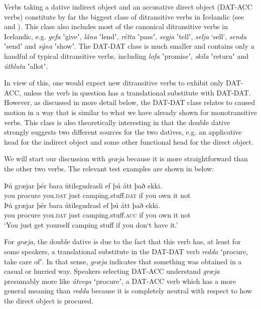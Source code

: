 \documentclass[output=paper,modfonts,nonflat,colorlinks,citecolor=brown]{langsci/langscibook}
\begin{document}
Verbs taking a dative indirect object and an accusative direct object (DAT-ACC verbs) constitute by far the biggest class of ditransitive verbs in Icelandic (see \citealt{ZaenenMalingThráinsson1985} and \citealt{Jónsson2000}). This class also includes most of the canonical ditransitive verbs in Icelandic, e.g. \textit{gefa} ʽgiveʼ, \textit{lána} ʽlendʼ, \textit{rétta} ʽpassʼ, \textit{segja} ʽtellʼ, \textit{selja} ‘sell’, \textit{senda} ʽsendʼ and \textit{sýna} ʽshowʼ. The DAT-DAT class is much smaller and contains only a handful of typical ditransitive verbs, including \textit{lofa} ʽpromiseʼ, \textit{skila} ʽreturnʼ and \textit{úthluta} ʽallotʼ.

In view of this, one would expect new ditransitive verbs to exhibit only DAT-ACC, unless the verb in question has a translational substitute with DAT-DAT. However, as discussed in more detail below, the DAT-DAT class relates to caused motion in a way that is similar to what we have already shown for monotransitive verbs. This class is also theoretically interesting in that the double dative strongly suggests two different sources for the two datives, e.g. an applicative head for the indirect object and some other functional head for the direct object.

We will start our discussion with \textit{græja} because it is more straightforward than the other two verbs. The relevant test examples are shown in  below:


\ea%
    \label{ex:jonsson:9}
\ea
\gll  Þú  græjar  þér  bara  útilegudrasli  ef  þú  átt  það  ekki.\\
   you  procure  you.\textsc{dat}  just  camping.stuff.\textsc{dat}  if  you  own  it  not\\



\ex
\gll   Þú  græjar  þér  bara  útilegudrasl  ef  þú  átt  það  ekki.\\
 you  procure  you.\textsc{dat}  just  camping.stuff.\textsc{acc}  if  you  own  it  not\\
 \glt `You just get yourself camping stuff if you don‘t have it.'
\z
\z

For \textit{græja}, the double dative is due to the fact that this verb has, at least for some speakers, a translational substitute in the DAT-DAT verb \textit{redda} ʻprocure, take care ofʼ. In that sense, \textit{græja} indicates that something was obtained in a casual or hurried way. Speakers selecting DAT-ACC understand \textit{græja} presumably more like \textit{útvega} ʻprocureʼ, a DAT-ACC verb which has a more general meaning than \textit{redda} because it is completely neutral with respect to how the direct object is procured.
\end{document}
